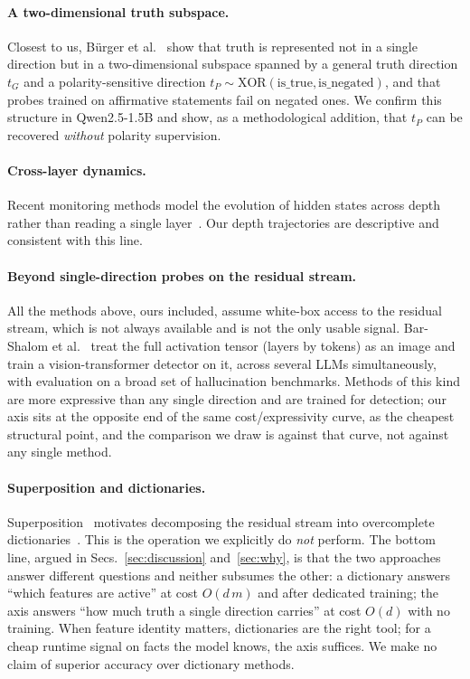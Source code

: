 \documentclass[11pt]{article}
\begin{document}
\paragraph{A two-dimensional truth subspace.} Closest to us, B\"urger et
al.~\cite{burger2024} show that truth is represented not in a single direction
but in a two-dimensional subspace spanned by a general truth direction $t_G$
and a polarity-sensitive direction $t_P \sim
\mathrm{XOR}(\text{is\_true},\text{is\_negated})$, and that probes trained on
affirmative statements fail on negated ones. We confirm this structure in
Qwen2.5-1.5B and show, as a methodological addition, that $t_P$ can be
recovered \emph{without} polarity supervision.

\paragraph{Cross-layer dynamics.} Recent monitoring methods model the
evolution of hidden states across depth rather than reading a single
layer~\cite{icr2025,hsad2025}. Our depth trajectories are descriptive and
consistent with this line.

\paragraph{Beyond single-direction probes on the residual stream.} All the
methods above, ours included, assume white-box access to the residual stream,
which is not always available and is not the only usable signal. Bar-Shalom et
al.~\cite{barshalom2025} treat the full activation tensor (layers by tokens)
as an image and train a vision-transformer detector on it, across several LLMs
simultaneously, with evaluation on a broad set of hallucination benchmarks.
Methods of this kind are more expressive than any single direction and are
trained for detection; our axis sits at the opposite end of the same
cost/expressivity curve, as the cheapest structural point, and the comparison
we draw is against that curve, not against any single method.

\paragraph{Superposition and dictionaries.} Superposition~\cite{elhage2022}
motivates decomposing the residual stream into overcomplete
dictionaries~\cite{cunningham2023,bricken2023}. This is the operation we
explicitly do \emph{not} perform. The bottom line, argued in
Secs.~\ref{sec:discussion} and~\ref{sec:why}, is that the two approaches
answer different questions and neither subsumes the other: a dictionary
answers ``which features are active'' at cost $O(d\,m)$ and after dedicated
training; the axis answers ``how much truth a single direction carries'' at
cost $O(d)$ with no training. When feature identity matters, dictionaries are
the right tool; for a cheap runtime signal on facts the model knows, the axis
suffices. We make no claim of superior accuracy over dictionary methods.
\end{document}
